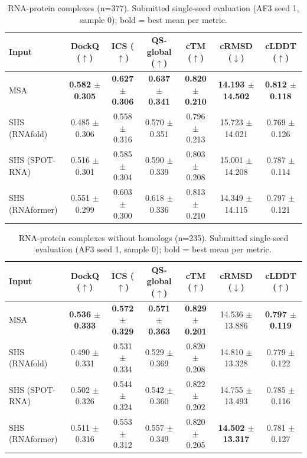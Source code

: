 \begin{table}[htbp]
\centering
\caption{RNA-protein complexes (n=377). Submitted single-seed evaluation (AF3 seed 1, sample 0); bold = best mean per metric.}
\label{tab:rna_protein_complexes}
\begin{tabular}{lcccccc}
\toprule
Input & DockQ ($\uparrow$) & ICS ($\uparrow$) & QS-global ($\uparrow$) & cTM ($\uparrow$) & cRMSD ($\downarrow$) & cLDDT ($\uparrow$) \\
\midrule
MSA & \textbf{0.582 $\pm$ 0.305} & \textbf{0.627 $\pm$ 0.306} & \textbf{0.637 $\pm$ 0.341} & \textbf{0.820 $\pm$ 0.210} & \textbf{14.193 $\pm$ 14.502} & \textbf{0.812 $\pm$ 0.118} \\
SHS (RNAfold) & 0.485 $\pm$ 0.306 & 0.558 $\pm$ 0.316 & 0.570 $\pm$ 0.351 & 0.796 $\pm$ 0.213 & 15.723 $\pm$ 14.021 & 0.769 $\pm$ 0.126 \\
SHS (SPOT-RNA) & 0.516 $\pm$ 0.301 & 0.585 $\pm$ 0.304 & 0.590 $\pm$ 0.339 & 0.803 $\pm$ 0.208 & 15.001 $\pm$ 14.208 & 0.787 $\pm$ 0.114 \\
SHS (RNAformer) & 0.551 $\pm$ 0.299 & 0.603 $\pm$ 0.300 & 0.618 $\pm$ 0.336 & 0.813 $\pm$ 0.210 & 14.349 $\pm$ 14.115 & 0.797 $\pm$ 0.121 \\
\bottomrule
\end{tabular}
\end{table}

\begin{table}[htbp]
\centering
\caption{RNA-protein complexes without homologs (n=235). Submitted single-seed evaluation (AF3 seed 1, sample 0); bold = best mean per metric.}
\label{tab:rna_protein_complexes_without_homologs}
\begin{tabular}{lcccccc}
\toprule
Input & DockQ ($\uparrow$) & ICS ($\uparrow$) & QS-global ($\uparrow$) & cTM ($\uparrow$) & cRMSD ($\downarrow$) & cLDDT ($\uparrow$) \\
\midrule
MSA & \textbf{0.536 $\pm$ 0.333} & \textbf{0.572 $\pm$ 0.329} & \textbf{0.571 $\pm$ 0.363} & \textbf{0.829 $\pm$ 0.201} & 14.536 $\pm$ 13.886 & \textbf{0.797 $\pm$ 0.119} \\
SHS (RNAfold) & 0.490 $\pm$ 0.331 & 0.531 $\pm$ 0.334 & 0.529 $\pm$ 0.369 & 0.820 $\pm$ 0.208 & 14.810 $\pm$ 13.328 & 0.779 $\pm$ 0.122 \\
SHS (SPOT-RNA) & 0.502 $\pm$ 0.326 & 0.544 $\pm$ 0.324 & 0.542 $\pm$ 0.360 & 0.822 $\pm$ 0.202 & 14.755 $\pm$ 13.493 & 0.785 $\pm$ 0.116 \\
SHS (RNAformer) & 0.511 $\pm$ 0.316 & 0.553 $\pm$ 0.312 & 0.557 $\pm$ 0.349 & 0.820 $\pm$ 0.205 & \textbf{14.502 $\pm$ 13.317} & 0.781 $\pm$ 0.127 \\
\bottomrule
\end{tabular}
\end{table}

